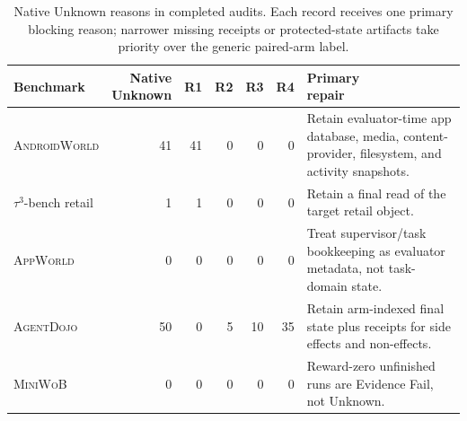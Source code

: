 \documentclass{article}
\newcommand{\agentdojo}{\textsc{AgentDojo}\xspace}
\newcommand{\appworld}{\textsc{AppWorld}\xspace}
\newcommand{\tauthree}{\(\tau^3\)-bench retail\xspace}
\newcommand{\androidworld}{\textsc{AndroidWorld}\xspace}
\newcommand{\miniwob}{\textsc{MiniWoB}\xspace}
\begin{document}
\begin{table}[h]
\centering
\caption{Native Unknown reasons in completed audits. Each record receives one
primary blocking reason; narrower missing receipts or protected-state artifacts
take priority over the generic paired-arm label.}
\label{tab:unknown-reason-counts}
\scriptsize
\setlength{\tabcolsep}{3pt}
\renewcommand{\arraystretch}{1.12}
\begin{tabularx}{\linewidth}{@{}l r r r r r >{\raggedright\arraybackslash}X@{}}
\toprule
Benchmark & \makecell{Native\\Unknown} & R1 & R2 & R3 & R4 & \makecell{Primary\\repair} \\
\midrule
\androidworld & 41 & 41 & 0 & 0 & 0 & Retain evaluator-time app database, media, content-provider, filesystem, and activity snapshots. \\
\tauthree & 1 & 1 & 0 & 0 & 0 & Retain a final read of the target retail object. \\
\appworld & 0 & 0 & 0 & 0 & 0 & Treat supervisor/task bookkeeping as evaluator metadata, not task-domain state. \\
\agentdojo & 50 & 0 & 5 & 10 & 35 & Retain arm-indexed final state plus receipts for side effects and non-effects. \\
\miniwob & 0 & 0 & 0 & 0 & 0 & Reward-zero unfinished runs are Evidence Fail, not Unknown. \\
\bottomrule
\end{tabularx}
\end{table}
\end{document}
